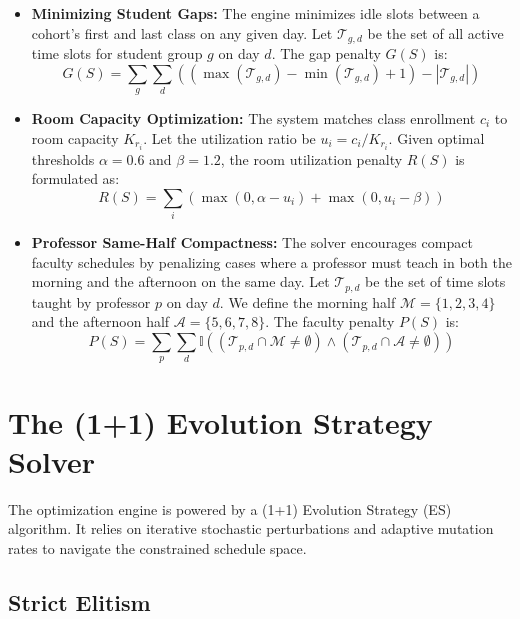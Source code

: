 \begin{itemize}
    \item \textbf{Minimizing Student Gaps:} The engine minimizes idle slots between a cohort's first and last class on any given day. Let $\mathcal{T}_{g,d}$ be the set of all active time slots for student group $g$ on day $d$. The gap penalty $G(S)$ is:
    \begin{equation}
        G(S) = \sum_{g} \sum_{d} \left( (\max(\mathcal{T}_{g,d}) - \min(\mathcal{T}_{g,d}) + 1) - |\mathcal{T}_{g,d}| \right)
    \end{equation}

    \item \textbf{Room Capacity Optimization:} The system matches class enrollment $c_i$ to room capacity $K_{r_i}$. Let the utilization ratio be $u_i = c_i / K_{r_i}$. Given optimal thresholds $\alpha = 0.6$ and $\beta = 1.2$, the room utilization penalty $R(S)$ is formulated as:
    \begin{equation}
        R(S) = \sum_{i} \left( \max(0, \alpha - u_i) + \max(0, u_i - \beta) \right)
    \end{equation}

    \item \textbf{Professor Same-Half Compactness:} The solver encourages compact faculty schedules by penalizing cases where a professor must teach in both the morning and the afternoon on the same day. Let $\mathcal{T}_{p,d}$ be the set of time slots taught by professor $p$ on day $d$. We define the morning half $\mathcal{M} = \{1, 2, 3, 4\}$ and the afternoon half $\mathcal{A} = \{5, 6, 7, 8\}$. The faculty penalty $P(S)$ is:
    \begin{equation}
        P(S) = \sum_{p} \sum_{d} \mathbb{I}\left( (\mathcal{T}_{p,d} \cap \mathcal{M} \neq \emptyset) \land (\mathcal{T}_{p,d} \cap \mathcal{A} \neq \emptyset) \right)
    \end{equation}
\end{itemize}

\section{The (1+1) Evolution Strategy Solver}

The optimization engine is powered by a (1+1) Evolution Strategy (ES) algorithm. It relies on iterative stochastic perturbations and adaptive mutation rates to navigate the constrained schedule space.

\subsection{Strict Elitism}

